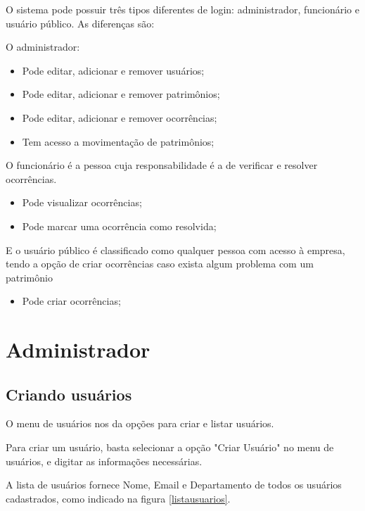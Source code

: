 \documentclass[
	12pt,				%
	openright,			%
	oneside,			%
	a4paper,			%
	english,			%
	french,				%
	spanish,			%
	brazil				%
	]{abntex2}
\begin{document}
O sistema pode possuir três tipos diferentes de login: administrador, funcionário e usuário público. As diferenças são:

O administrador:

\begin{itemize}
	\item Pode editar, adicionar e remover usuários;
	\item Pode editar, adicionar e remover patrimônios;
	\item Pode editar, adicionar e remover ocorrências;
	\item Tem acesso a movimentação de patrimônios;
\end{itemize}

O funcionário é a pessoa cuja responsabilidade é a de verificar e resolver ocorrências.

\begin{itemize}
	\item Pode visualizar ocorrências;
	\item Pode marcar uma ocorrência como resolvida;
\end{itemize}

E o usuário público é classificado como qualquer pessoa com acesso à empresa, tendo a opção de criar ocorrências caso exista algum problema com um patrimônio

\begin{itemize}
	\item Pode criar ocorrências;
\end{itemize}

\section{Administrador}

\subsection{Criando usuários}

O menu de usuários nos da opções para criar e listar usuários.

Para criar um usuário, basta selecionar a opção "Criar Usuário" no menu de usuários, e digitar as informações necessárias.

A lista de usuários fornece Nome, Email e Departamento de todos os usuários cadastrados, como indicado na figura \ref{listausuarios}.

\end{document}
